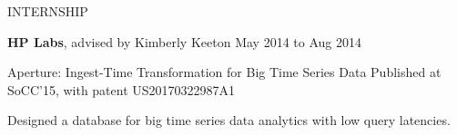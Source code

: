 \documentclass{resume} %
\begin{document}
\begin{rSection}{INTERNSHIP}

\hspace{-1em} \textbf{HP Labs}, advised by Kimberly Keeton \hfill {May 2014 to Aug 2014}

\vspace{-.1in}
\begin{rSubsection}{\hspace{-1em} Aperture: Ingest-Time Transformation for Big Time Series Data}{}
{Published at SoCC'15, with patent US20170322987A1}{}
\vspace{-0.3em}
\item Designed a database for big time series data analytics with low query latencies.
\end{rSubsection}

\end{rSection}
\end{document}
